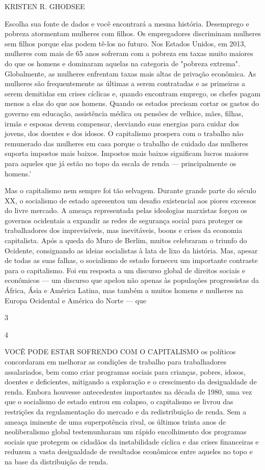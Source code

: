  \par 
KRISTEN R. GHODSEE
 \par 
Escolha sua fonte de dados e você encontrará a mesma história. Desemprego e pobreza atormentam mulheres com filhos. Os empregadores discriminam mulheres sem filhos porque elas podem tê-los no futuro. Nos Estados Unidos, em 2013, mulheres com mais de {\color{blue}65} anos sofreram com a pobreza em taxas muito maiores do que os homens e dominaram aquelas na categoria de "pobreza extrema". Globalmente, as mulheres enfrentam taxas mais altas de privação econômica. As mulheres são frequentemente as últimas a serem contratadas e as primeiras a serem demitidas em crises cíclicas e, quando encontram emprego, os chefes pagam menos a elas do que aos homens. Quando os estados precisam cortar os gastos do governo em educação, assistência médica ou pensões de velhice, mães, filhas, irmãs e esposas devem compensar, desviando suas energias para cuidar dos jovens, dos doentes e dos idosos. O capitalismo prospera com o trabalho não remunerado das mulheres em casa porque o trabalho de cuidado das mulheres suporta impostos mais baixos. Impostos mais baixos significam lucros maiores para aqueles que já estão no topo da escala de renda — principalmente os homens.'
 \par 
Mas o capitalismo nem sempre foi tão selvagem. Durante grande parte do século XX, o socialismo de estado apresentou um desafio existencial aos piores excessos do livre mercado. A ameaça representada pelas ideologias marxistas forçou os governos ocidentais a expandir as redes de segurança social para proteger os trabalhadores dos imprevisíveis, mas inevitáveis, boons e crises da economia capitalista. Após a queda do Muro de Berlim, muitos celebraram o triunfo do Ocidente, consignando as ideias socialistas à lata de lixo da história. Mas, apesar de todas as suas falhas, o socialismo de estado forneceu um importante contraste para o capitalismo. Foi em resposta a um discurso global de direitos sociais e econômicos — um discurso que apelou não apenas às populações progressistas da África, Ásia e América Latina, mas também a muitos homens e mulheres na Europa Ocidental e América do Norte — que
 \par 
3
 \par 
4
 \par 
VOCÊ PODE ESTAR SOFRENDO COM O CAPITALISMO os políticos concordaram em melhorar as condições de trabalho para trabalhadores assalariados, bem como criar programas sociais para crianças, pobres, idosos, doentes e deficientes, mitigando a exploração e o crescimento da desigualdade de renda. Embora houvesse antecedentes importantes na década de 1980, uma vez que o socialismo de estado entrou em colapso, o capitalismo se livrou das restrições da regulamentação do mercado e da redistribuição de renda. Sem a ameaça iminente de uma superpotência rival, os últimos trinta anos de neoliberalismo global testemunharam um rápido encolhimento dos programas sociais que protegem os cidadãos da instabilidade cíclica e das crises financeiras e reduzem a vasta desigualdade de resultados econômicos entre aqueles no topo e na base da distribuição de renda.
